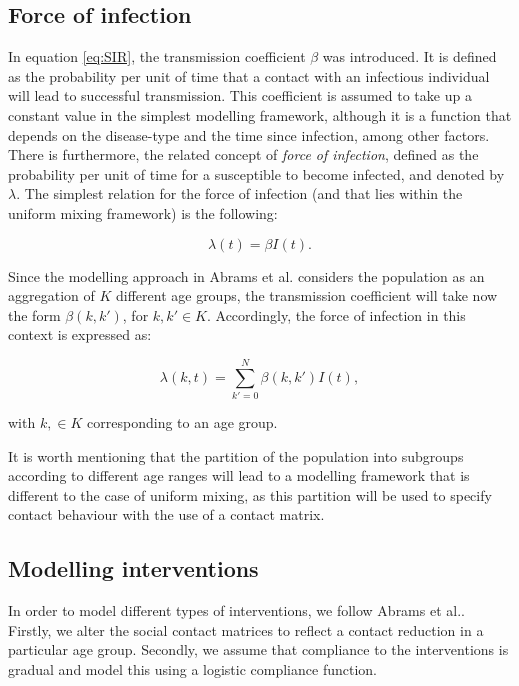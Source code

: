 \documentclass[a4paper]{article}
\theoremstyle{remark}
\begin{document}
\subsection{Force of infection}
In equation \eqref{eq:SIR}, the transmission coefficient $\beta$ was introduced. It is defined as the probability per unit of time that a contact with an infectious individual will lead to successful transmission. This coefficient is assumed to take up a constant value in the simplest modelling framework, although it is a function that depends on the disease-type and the time since infection, among other factors. There is furthermore, the related concept of \textit{force of infection}, defined as the probability per unit of time for a susceptible to become infected, and denoted by $\lambda$. The simplest relation for the force of infection (and that lies within the uniform mixing framework) is the following:

\begin{equation*}
\label{eq:lambda}
    \lambda(t)=\beta I(t).
\end{equation*}

\medskip
\noindent
Since the modelling approach in Abrams et al. considers the population as an aggregation of $K$ different age groups, the transmission coefficient will take now the form $\beta(k,k')$, for $k, k'\in K$. Accordingly, the force of infection in this context is expressed as:


\begin{equation}
\label{eq:lambda2}
    \lambda(k,t)=\sum_{k'=0}^N \beta(k,k') I(t),
\end{equation}

\noindent
with $k, \in K$ corresponding to an age group.

It is worth mentioning that the partition of the population into subgroups according to different age ranges will lead to a modelling framework that is different to the case of uniform mixing, as this partition will be used to specify contact behaviour with the use of a contact matrix.

\subsection{Modelling interventions}
In order to model different types of interventions, we follow Abrams et al.. Firstly, we alter the social contact matrices to reflect a contact reduction in a particular age group. Secondly, we assume that compliance to the interventions is gradual and model this using a logistic compliance function.
\end{document}
